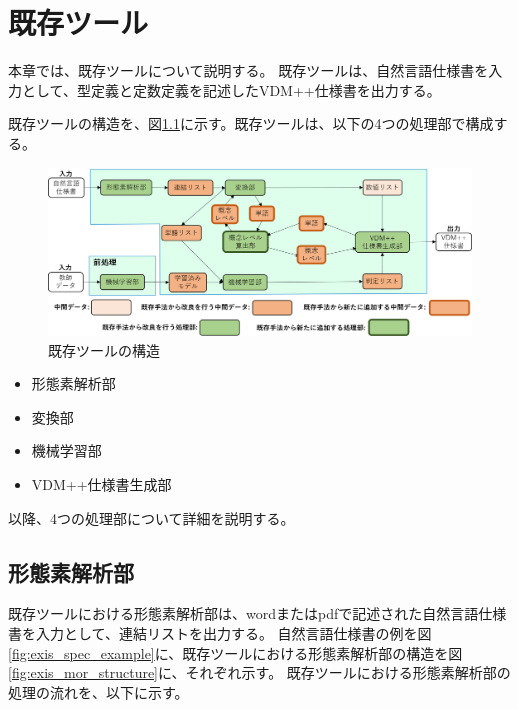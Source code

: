 \chapter{既存ツール}\label{cha:Function}

本章では、既存ツール\cite{shigyo1,shigyo2, shigyo3,shigyo4}について説明する。
既存ツールは、自然言語仕様書を入力として、型定義と定数定義を記述したVDM++仕様書を出力する。

既存ツールの構造を、図\ref{fig:exis_structure}に示す。既存ツールは、以下の4つの処理部で構成する。

\begin{figure}[tp]
    \begin{center}
        \includegraphics[width=1.0\columnwidth]{image/vgml_structure.png}
        \caption{既存ツールの構造}
        \label{fig:exis_structure}
    \end{center}
\end{figure}

\begin{itemize}
    \item 形態素解析部
    \item 変換部
    \item 機械学習部
    \item VDM++仕様書生成部
\end{itemize}

以降、4つの処理部について詳細を説明する。

\section{形態素解析部}
既存ツールにおける形態素解析部は、wordまたはpdfで記述された自然言語仕様書を入力として、連結リストを出力する。
自然言語仕様書の例を図\ref{fig:exis_spec_example}に、既存ツールにおける形態素解析部の構造を図\ref{fig:exis_mor_structure}に、それぞれ示す。
既存ツールにおける形態素解析部の処理の流れを、以下に示す。


